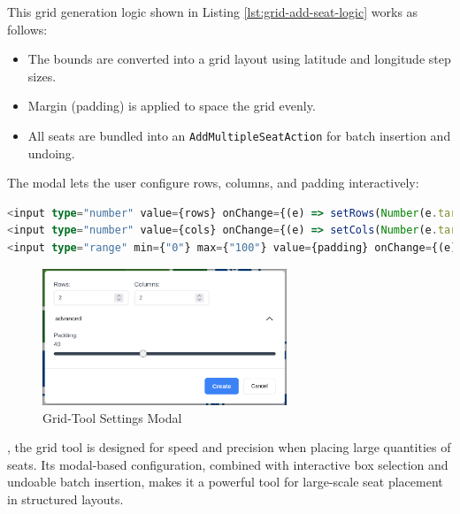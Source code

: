 This grid generation logic shown in Listing \ref{lst:grid-add-seat-logic} works as follows:
\begin{itemize}
    \item The bounds are converted into a grid layout using latitude and longitude step sizes.
    \item Margin (padding) is applied to space the grid evenly.
    \item All seats are bundled into an \texttt{AddMultipleSeatAction} for batch insertion and undoing.
\end{itemize}

The modal lets the user configure rows, columns, and padding interactively:

\begin{lstlisting}[language=TypeScript, caption=Modal Input Fields, label=lst:grid-modal-ui]
<input type="number" value={rows} onChange={(e) => setRows(Number(e.target.value))} />
<input type="number" value={cols} onChange={(e) => setCols(Number(e.target.value))} />
<input type="range" min={"0"} max={"100"} value={padding} onChange={(e) => setPadding(Number(e.target.value))} />
\end{lstlisting}

\begin{figure}[H]
    \centering
    \includegraphics[width=0.65\textwidth]{pics/grid-tool.png}
    \caption{Grid-Tool Settings Modal}
    \label{fig:grid-tool-toolbar}
\end{figure}

, the grid tool is designed for speed and precision when placing large quantities of seats. Its modal-based configuration, combined with interactive box selection and undoable batch insertion, makes it a powerful tool for large-scale seat placement in structured layouts.
